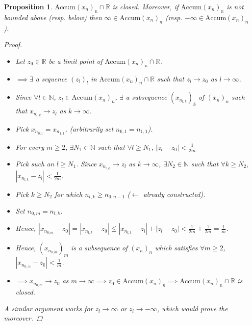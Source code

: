 \documentclass[10pt]{article}
\newcommand{\N}{\mathbb{N}}
\newcommand{\R}{\mathbb{R}}
\newtheorem{proposition}[theorem]{Proposition}
\theoremstyle{definition}
\theoremstyle{remark}
\begin{document}
\begin{proposition}
    $\text{Accum}(x_n)_n \cap \R$ is closed. Moreover, if $\text{Accum}(x_n)_n$ is not bounded above (resp. below) then
    $\infty \in \text{Accum}(x_n)_n$ (resp. $-\infty \in \text{Accum}(x_n)_n$).
    \begin{proof}
        \hfill
        \begin{itemize}
            \item Let $z_0 \in \R$ be a limit point of $\text{Accum}(x_n)_n \cap \R$.
            \item $\implies \exists$ a sequence $(z_l)_l$ in $\text{Accum}(x_n)_n \cap \R$ such that $z_l \to z_0$ as $l \to \infty$.
            \item Since $\forall l \in \N$, $z_l \in \text{Accum}(x_n)_n$, $\exists$ a subsequence $(x_{n_{l, k}})_k$ of $(x_n)_n$ such that $x_{n_{l,k}} \to z_l$ as $k \to \infty$.
            \item Pick $x_{n_{0, 1}} = x_{n_{1, 1}}$. (arbitrarily set $n_{0, 1} = n_{1, 1}$).
            \item For every $m \geq 2$, $\exists N_1 \in \N$ such that $\forall l \geq N_1$,
                $|z_l - z_0| < \frac{1}{2m}$
            \item Pick such an $l \geq N_1$. Since $x_{n_{l, k}} \to z_l$ as $k \to \infty$, $\exists N_2 \in \N$ such that $\forall k \geq N_2$, $|x_{n_{l, k}} - z_l| < \frac{1}{2m}$.
            \item Pick $k \geq N_2$ for which $n_{l, k} \geq n_{0, n-1}$ ($\leftarrow$ already constructed).
            \item Set $n_{0, m} = n_{l, k}$.
            \item Hence, $|x_{n_{0, m}} - z_0| = |x_{n_{l, k}} - z_0|
                \leq |x_{n_{l, k}} - z_l| + |z_l - z_0| <
                \frac{1}{2m} + \frac{1}{2m} = \frac{1}{m}$.
            \item Hence, $(x_{n_{0, m}})_m$ is a subsequence of $(x_n)_n$ which satisfies
                $\forall m \geq 2$, $|x_{n_{0, m}} - z_0| < \frac{1}{m}$.
            \item $\implies x_{n_{0, m}} \to z_0$ as $m \to \infty \implies z_0 \in \text{Accum}(x_n)_n \implies \text{Accum}(x_n)_n \cap \R$ is closed.
        \end{itemize}
        A similar argument works for $z_l \to \infty$ or $z_l \to -\infty$, which would prove the moreover.
    \end{proof}
\end{proposition}
\end{document}
